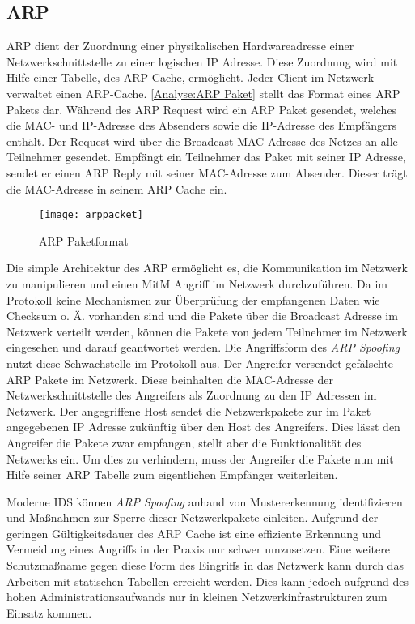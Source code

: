 \subsection{\ac{ARP}}
\label{Analyse:ARP}
\ac{ARP} dient der Zuordnung einer physikalischen Hardwareadresse einer Netzwerkschnittstelle zu einer logischen \ac{IP} Adresse. Diese Zuordnung wird mit Hilfe einer Tabelle, des \ac{ARP}-Cache, ermöglicht. Jeder Client im Netzwerk verwaltet einen \ac{ARP}-Cache. \autoref{Analyse:ARP Paket} stellt das Format eines \ac{ARP} Pakets dar. Während des \ac{ARP} Request wird ein \ac{ARP} Paket gesendet, welches die MAC- und \ac{IP}-Adresse des Absenders sowie die \ac{IP}-Adresse des Empfängers enthält. Der Request wird über die Broadcast MAC-Adresse des Netzes an alle Teilnehmer gesendet. Empfängt ein Teilnehmer das Paket mit seiner \ac{IP} Adresse, sendet er einen \ac{ARP} Reply mit seiner MAC-Adresse zum Absender. Dieser trägt die MAC-Adresse in seinem \ac{ARP} Cache ein.

\begin{figure}[h]
  \centering
  \texttt{[image: arppacket]}
  \caption{ARP Paketformat}
  \label{Analyse:ARP Paket}
\end{figure}

\clearpage

Die simple Architektur des \ac{ARP} ermöglicht es, die Kommunikation im Netzwerk zu manipulieren und einen \ac{MitM} Angriff im Netzwerk durchzuführen. Da im Protokoll keine Mechanismen zur Überprüfung der empfangenen Daten wie Checksum o. Ä. vorhanden sind und die Pakete über die Broadcast Adresse im Netzwerk verteilt werden, können die Pakete von jedem Teilnehmer im Netzwerk eingesehen und darauf geantwortet werden. Die Angriffsform des \textit{\ac{ARP} Spoofing} nutzt diese Schwachstelle im Protokoll aus. Der Angreifer versendet gefälschte \ac{ARP} Pakete im Netzwerk. Diese beinhalten die MAC-Adresse der Netzwerkschnittstelle des Angreifers als Zuordnung zu den \ac{IP} Adressen im Netzwerk. Der angegriffene Host sendet die Netzwerkpakete zur im Paket angegebenen \ac{IP} Adresse zukünftig über den Host des Angreifers. Dies lässt den Angreifer die Pakete zwar empfangen, stellt aber die Funktionalität des Netzwerks ein. Um dies zu verhindern, muss der Angreifer die Pakete nun mit Hilfe seiner \ac{ARP} Tabelle zum eigentlichen Empfänger weiterleiten.

Moderne \ac{IDS} können \textit{\ac{ARP} Spoofing} anhand von Mustererkennung identifizieren und Maßnahmen zur Sperre dieser Netzwerkpakete einleiten. Aufgrund der geringen Gültigkeitsdauer des \ac{ARP} Cache ist eine effiziente Erkennung und Vermeidung eines Angriffs in der Praxis nur schwer umzusetzen. Eine weitere Schutzmaßname gegen diese Form des Eingriffs in das Netzwerk kann durch das Arbeiten mit statischen Tabellen erreicht werden. Dies kann jedoch aufgrund des hohen Administrationsaufwands nur in kleinen Netzwerkinfrastrukturen zum Einsatz kommen.

